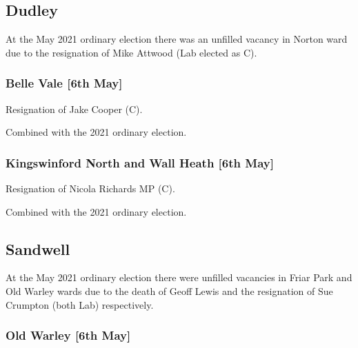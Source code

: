 \documentclass[a4paper,openany]{book}
\begin{document}
\begin{resultsiii}
\subsection*{Dudley}

At the May 2021 ordinary election there was an unfilled vacancy in Norton ward due to the resignation of Mike Attwood (Lab elected as C).

\subsubsection*{Belle Vale \hspace*{\fill}\nolinebreak[1]%
	\enspace\hspace*{\fill}
	[6th May]}


Resignation of Jake Cooper (C).

Combined with the 2021 ordinary election.

\subsubsection*{Kingswinford North and Wall Heath \hspace*{\fill}\nolinebreak[1]%
	\enspace\hspace*{\fill}
	[6th May]}


Resignation of Nicola Richards MP (C).

Combined with the 2021 ordinary election.

\subsection*{Sandwell}

At the May 2021 ordinary election there were unfilled vacancies in Friar Park and Old Warley wards due to the death of Geoff Lewis and the resignation of Sue Crumpton (both Lab) respectively.

\subsubsection*{Old Warley \hspace*{\fill}\nolinebreak[1]%
	\enspace\hspace*{\fill}
	[6th May]}


\end{resultsiii}
\end{document}
